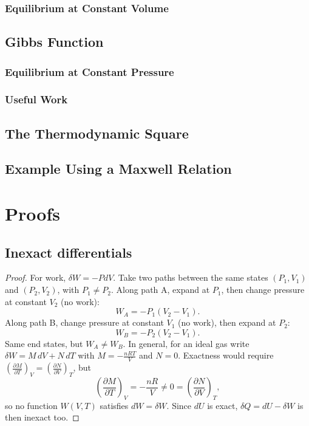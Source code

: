 \documentclass{article}
\begin{document}
\subsubsection{Equilibrium at Constant Volume}
\subsection{Gibbs Function}
\subsubsection{Equilibrium at Constant Pressure}
\subsubsection{Useful Work}
\subsection{The Thermodynamic Square}
\subsection{Example Using a Maxwell Relation}


\newpage
\appendix
\section{Proofs}
\label{section:proofs}
\subsection{Inexact differentials}
\label{subsection:inexact-differential}
\begin{proof}
    For work, $\delta W = -PdV$. Take two paths between the same states $(P_1, V_1)$ and $(P_2, V_2)$, with $P_1 \neq P_2$. Along path A, expand at $P_1$, then change pressure at constant $V_2$ (no work):
    \[W_A = -P_1(V_2 - V_1).\]
    Along path B, change pressure at constant $V_1$ (no work), then expand at $P_2$:
    \[W_B = -P_2(V_2 - V_1).\]
    Same end states, but $W_A \neq W_B$. In general, for an ideal gas write $\delta W = M\,dV + N\,dT$ with $M = -\frac{nRT}{V}$ and $N = 0$. Exactness would require $\left(\frac{\partial M}{\partial T}\right)_V = \left(\frac{\partial N}{\partial V}\right)_T$, but
    \[\left(\frac{\partial M}{\partial T}\right)_V = -\frac{nR}{V} \neq 0 = \left(\frac{\partial N}{\partial V}\right)_T,\]
    so no function $W(V, T)$ satisfies $dW = \delta W$. Since $dU$ is exact, $\delta Q = dU - \delta W$ is then inexact too.
\end{proof}
\end{document}
